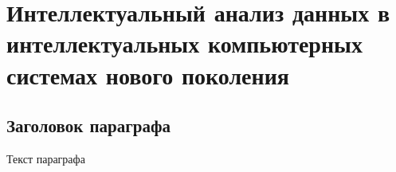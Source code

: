 \chapter{Интеллектуальный анализ данных в интеллектуальных компьютерных системах нового поколения}
\label{chapter_data_mining}


\section{Заголовок параграфа}
Текст параграфа

%